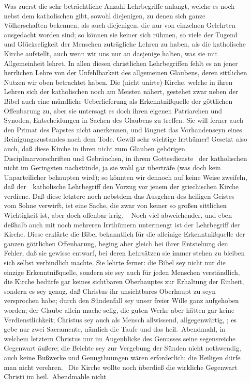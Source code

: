 \begin{aufza}
\item Was zuerst die sehr beträchtliche Anzahl  Lehrbegriffe anlangt, welche es noch nebst dem katholischen gibt, sowohl diejenigen, zu denen sich ganze Völkerschaften bekennen, als auch diejenigen, die nur von einzelnen Gelehrten ausgedacht worden sind; so können sie keiner sich rühmen, so viele der Tugend und Glückseligkeit der Menschen zuträgliche Lehren zu haben, als die katholische Kirche aufstellt, auch wenn wir uns nur an dasjenige halten, was sie mit Allgemeinheit lehret. In allen diesen christlichen Lehrbegriffen fehlt es an jener herrlichen Lehre von der Unfehlbarkeit des allgemeinen Glaubens, deren sittlichen Nutzen wir oben betrachtet haben. Die  (nicht unirte) Kirche, welche in ihren Lehren sich der katholischen noch am Meisten nähert, gestehet zwar neben der Bibel auch eine mündliche Ueberlieferung als Erkenntnißquelle der göttlichen Offenbarung zu, aber sie untersagt es doch ihren eigenen Patriarchen und Synoden, Entscheidungen in Sachen des Glaubens zu treffen. Sie will ferner auch den Primat des Papstes nicht anerkennen, und läugnet das Vorhandenseyn eines Reinigungszustandes nach dem Tode. Gewiß sehr wichtige Irrthümer! Gesetzt also auch, daß diese Kirche in ihren nicht zum Glauben gehörigen Disciplinarvorschriften und Gebräuchen, in ihrem Gottesdienste \usw\ der katholischen nicht im Geringsten nachstünde, ja sie wohl gar überträfe (was doch kein Unparteilicher behaupten wird); so könnten wir dennoch auf keine Weise zweifeln, daß der~\ katholische Lehrbegriff den Vorzug vor jenem der griechischen Kirche verdiene. Daß diese letztere noch nebstdem das Ausgehen des heiligen Geistes vom Sohne verwirft, ist eine Sache, die zwar von keiner so großen sittlichen Wichtigkeit ist, aber doch offenbar irrig. -- Noch viel abweichender, und eben deßhalb auch mit noch mehreren Irrthümern untermengt ist der Lehrbegriff der  Kirche. Diese erklärte die Bibel bekanntlich für die alleinige Erkenntnißquelle der ganzen göttlichen Offenbarung, beging aber gleich bei ihrer Entstehung den Fehler, daß sie gewisse  entwarf, bei deren Lehrsätzen sie immer stehen zu bleiben sich selbst verbindlich machte. Sie lehrte ferner: die Bibel sey nicht nur die einzige Erkenntnißquelle, sondern sie sey auch für jeden Menschen verständlich, die Kirche bedürfe gar keines sichtbaren Oberhauptes zur Erhaltung der Einheit, sondern es sey genug, daß Christus ihr unsichtbares Oberhaupt zu seyn versprochen habe; durch den Sündenfall sey unser freier Wille ganz aufgehoben worden; der Glaube allein mache selig, die guten Werke aber hätten gar keine Verdienstlichkeit; Christus sey auch als Mensch allwissend, allgegenwärtig, \usw ; es gebe nur zwei Sacramente, nämlich die Taufe und das heil.\ Abendmahl, in welchem letztern Christus nur im Augenblicke des Genusses seine segensreiche Gegenwart äußere; die Beichte sey zur Vergebung der Sünden nicht nothwendig, auch keine Bußwerke und Genugthuungen wären erforderlich; die Heiligen dürfe man nicht verehren, \umA\  Die  Kirche wollte noch überdieß die wirkliche Gegenwart Christi im heil.\ Abendmahle nicht 
\end{aufza}

